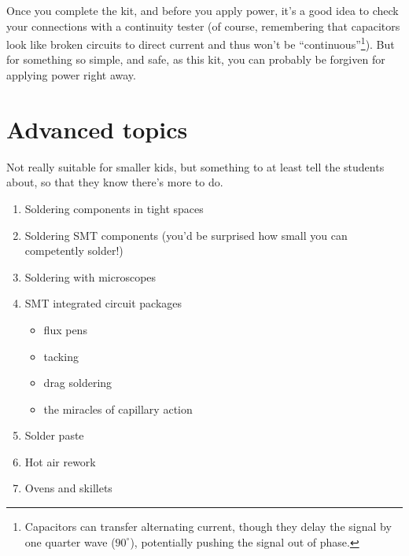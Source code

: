 \documentclass[12pt]{article}
\newcommand{\+}{\item}
\begin{document}
Once you complete the kit, and before you apply power, it's a good idea to check your connections with a continuity tester (of course, remembering that capacitors look like broken circuits to direct current and thus won't be ``continuous''\footnote{Capacitors can transfer alternating current, though they delay the signal by one quarter wave ($90^{\circ}$), potentially pushing the signal out of phase.}). But for something so simple, and safe, as this kit, you can probably be forgiven for applying power right away.

\section{Advanced topics}

Not really suitable for smaller kids, but something to at least tell the students about, so that they know there's more to do.

\begin{enumerate}
\+ Soldering components in tight spaces
\+ Soldering SMT components (you'd be surprised how small you can competently solder!)
\+ Soldering with microscopes
\+ SMT integrated circuit packages
	\begin{itemize}
	\+ flux pens
	\+ tacking
	\+ drag soldering
	\+ the miracles of capillary action
	\end{itemize}
\+ Solder paste
\+ Hot air rework
\+ Ovens and skillets
\end{enumerate}
\end{document}
